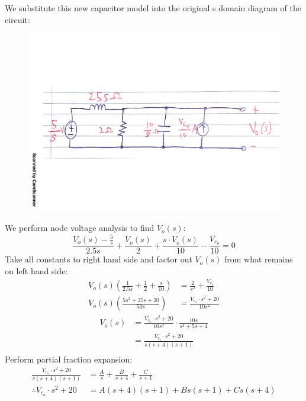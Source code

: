 \begin{enumerate}
{\begin{figure}[H]
		\end{figure}
		We substitute this new capacitor model into the original s domain diagram of the circuit:
		\begin{figure}[H]
			\centering
			\includegraphics[scale=0.5]{q2c2.pdf}
		\end{figure}
		We perform node voltage analysis to find $V_o(s)$:
		\begin{equation*}
			\frac{V_o(s) - \frac{5}{s}}{2.5s} + \frac{V_o(s)}{2} + \frac{s \cdot V_o(s)}{10} - \frac{V_{c_o}}{10} = 0
		\end{equation*}
		Take all constants to right hand side and factor out $V_o(s)$ from what remains on left hand side:
		\begin{align*}
			V_o(s) \left(\frac{1}{2.5s} +\frac{1}{2} + \frac{s}{10} \right) &= \frac{2}{s^2} + \frac{V_{c_o}}{10} \\
			V_o(s) \left(\frac{5s^2+25s+20}{50s} \right) &= \frac{V_{c_o} \cdot s^2 + 20}{10 s^2}
		\end{align*}
		\begin{align*}
			V_o(s) &= \frac{V_{c_o} \cdot s^2 + 20}{10s^2} \cdot \frac{10s}{s^2 + 5s + 4} \\
			&= \frac{V_{c_o} \cdot s^2 + 20}{s (s+4)(s+1)} \\
		\end{align*}
		Perform partial fraction expansion:
		\begin{align*}
			\frac{V_{c_o} \cdot s^2 + 20}{s (s+4)(s+1)} &= \frac{A}{s} + \frac{B}{s+4} + \frac{C}{s+1} \\
			\therefore V_{c_o} \cdot s^2 + 20 &= A(s+4)(s+1) + Bs(s+1) + Cs(s+4) \\

\end{align*}}
\end{enumerate}
